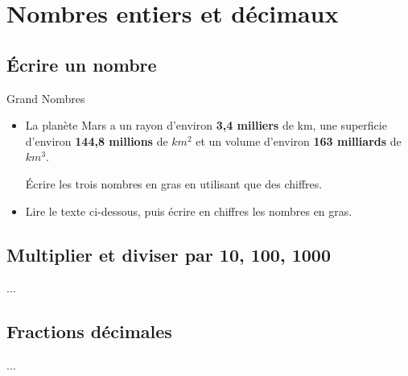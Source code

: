 \chapter{Nombres entiers et décimaux}

\section{\'Ecrire un nombre}

\begin{act}
	\caption{Grand Nombres}
	\label{act:nbres}
	
	\begin{itemize}
		\item La planète Mars a un rayon d'environ \textbf{3,4 milliers} de km, une superficie d'environ \textbf{144,8 millions} de $km^2$ et un volume d'environ \textbf{163 milliards} de $km^3$.
		
		\'Ecrire les trois nombres en gras en utilisant que des chiffres.
		
		\item Lire le texte ci-dessous, puis écrire en chiffres les nombres en gras.
	\end{itemize}
\end{act}

\section{Multiplier et diviser par 10, 100, 1000}

...
\section{Fractions décimales}
...